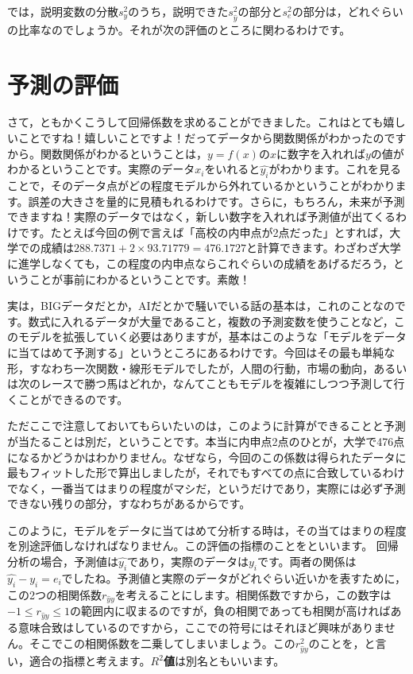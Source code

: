 \documentclass{ltjbook}
\begin{document}
では，説明変数の分散$s_y^2$のうち，説明できた$s_{\hat{y}}^2$の部分と$s_e^2$の部分は，どれぐらいの比率なのでしょうか。それが次の評価のところに関わるわけです。


\section{予測の評価}
さて，ともかくこうして回帰係数を求めることができました。これはとても嬉しいことですね！嬉しいことですよ！だってデータから関数関係がわかったのですから。関数関係がわかるということは，$y=f(x)$の$x$に数字を入れれば$y$の値がわかるということです。実際のデータ$x_i$をいれると$\hat{y_i}$がわかります。これを見ることで，そのデータ点がどの程度モデルから外れているかということがわかります。誤差の大きさを量的に見積もれるわけです。さらに，もちろん，未来が予測できますね！実際のデータではなく，新しい数字を入れれば予測値が出てくるわけです。たとえば今回の例で言えば「高校の内申点が2点だった」とすれば，大学での成績は$288.7371+2\times93.71779=476.1727$と計算できます。わざわざ大学に進学しなくても，この程度の内申点ならこれぐらいの成績をあげるだろう，ということが事前にわかるということです。素敵！

実は，BIGデータだとか，AIだとかで騒いでいる話の基本は，これのことなのです。数式に入れるデータが大量であること，複数の予測変数を使うことなど，このモデルを拡張していく必要はありますが，基本はこのような「モデルをデータに当てはめて予測する」というところにあるわけです。今回はその最も単純な形，すなわち一次関数・線形モデルでしたが，人間の行動，市場の動向，あるいは次のレースで勝つ馬はどれか，なんてこともモデルを複雑にしつつ予測して行くことができるのです。

ただここで注意しておいてもらいたいのは，このように計算ができることと予測が当たることは別だ，ということです。本当に内申点2点のひとが，大学で476点になるかどうかはわかりません。なぜなら，今回のこの係数は得られたデータに最もフィットした形で算出しましたが，それでもすべての点に合致しているわけでなく，一番当てはまりの程度がマシだ，というだけであり，実際には必ず予測できない残りの部分，すなわちがあるからです。

このように，モデルをデータに当てはめて分析する時は，その当てはまりの程度を別途評価しなければなりません。この評価の指標のことをといいます。
回帰分析の場合，予測値は$\hat{y_i}$であり，実際のデータは$y_i$です。両者の関係は$\hat{y_i}-y_i=e_i$でしたね。予測値と実際のデータがどれぐらい近いかを表すために，この2つの相関係数$r_{\hat{y}y}$を考えることにします。相関係数ですから，この数字は$-1\le r_{\hat{y}y} \le 1$の範囲内に収まるのですが，負の相関であっても相関が高ければある意味合致はしているのですから，ここでの符号にはそれほど興味がありません。そこでこの相関係数を二乗してしまいましょう。この$r_{\hat{y}y}^2$のことを，と言い，適合の指標と考えます。\textbf{$R^2$値}は別名ともいいます。
\end{document}
